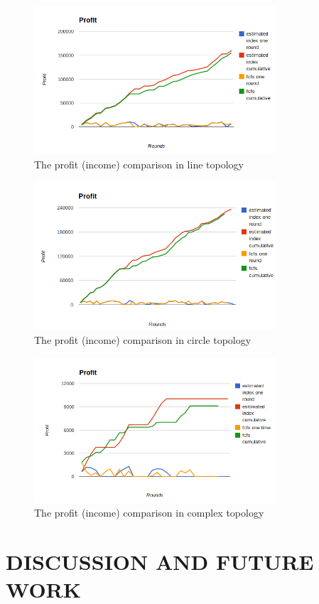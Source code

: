 \documentclass[a4paper,11pt,twocolumn]{article}
\begin{document}
\begin{figure}[ht!]
\centering
\includegraphics[width=90mm]{line_profit.png}
\caption{The profit (income) comparison in line topology}
\label{overflow}
\end{figure}

\begin{figure}[ht!]
\centering
\includegraphics[width=90mm]{circle_profit.png}
\caption{The profit (income) comparison in circle topology}
\label{overflow}
\end{figure}

\begin{figure}[ht!]
\centering
\includegraphics[width=90mm]{mytop_profit.png}
\caption{The profit (income) comparison in complex topology}
\label{overflow}
\end{figure}

\section{DISCUSSION AND FUTURE WORK}
\end{document}
